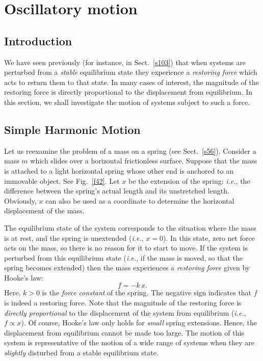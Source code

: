 \section{Oscillatory motion}
\subsection{Introduction}
We have  seen previously (for instance, in Sect.~\ref{s103}) that when systems
are perturbed from a {\em stable} equilibrium state they experience a {\em restoring
force} which acts to return them to that state. In many cases of interest, the magnitude of the 
restoring force is directly  proportional to the displacement from equilibrium.
In this section, we shall investigate the motion of systems subject to such a  force.

\subsection{Simple Harmonic Motion}
Let us reexamine the problem of a mass on a spring (see Sect.~\ref{s56}).
Consider a mass $m$ which slides over a horizontal frictionless surface. Suppose that
the mass is attached
to a light horizontal spring whose other end is anchored to an immovable object. See
Fig.~\ref{f42}. Let $x$ be the extension of the spring: {\em i.e.}, the difference between
the spring's actual length and its unstretched length. Obviously, $x$ can also be used as
a coordinate to determine the horizontal displacement of the mass. 

The equilibrium state of the system corresponds to the situation where
the mass is at rest, and the spring is unextended ({\em i.e.}, $x=0$).
In this state, zero net force acts on the mass, so there is no reason for it to start to move.
If the system is perturbed from this equilibrium state ({\em i.e.}, if the mass is moved, so that the
spring becomes extended) then the mass experiences a {\em restoring force} given by Hooke's law:
\begin{equation}
f = -k\,x.
\end{equation}
Here, $k>0$ is the {\em force constant} of the spring. The negative sign indicates that $f$ is indeed a restoring force. 
Note that the magnitude of the restoring
force is {\em directly proportional} to the displacement of the system from equilibrium 
({\em i.e.}, $f\propto x$). Of course, Hooke's law only holds for {\em small}\/ spring extensions.
Hence, the displacement from equilibrium cannot be made too large.
The motion of this system is representative of the
motion of a wide range of systems when they are {\em slightly} disturbed from a stable equilibrium state.

